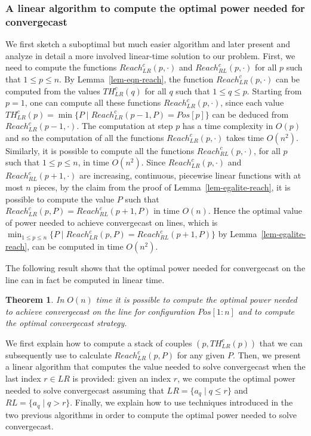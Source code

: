 \documentclass{article}
\newtheorem{theorem}{Theorem}
\newcommand\rclr{Reach_{LR}^c\xspace}
\newcommand\rcrl{Reach_{RL}^c\xspace}
\newcommand\tclr{TH_{LR}^c\xspace}
\newcommand\convergecast{convergecast\xspace}
\begin{document}
\subsubsection{A linear algorithm to compute the optimal power needed for
  {\convergecast}}  

We first sketch a suboptimal but much easier algorithm and later present and analyze in detail
a more involved linear-time solution to our problem.
First, we need to compute the functions $\rclr(p,\cdot)$ and $\rcrl(p,\cdot)$ for all $p$ such that $1\leq p\leq n$. By Lemma~\ref{lem-eqn-reach}, the function $\rclr(p,\cdot)$ can be computed from the values $\tclr(q)$ for all $q$ such that $1 \leq q\leq p$. Starting from $p=1$, one can compute all these functions $\rclr(p,\cdot)$, since each value $\tclr(p)=\min\{P\mid \rclr(p-1,P)=Pos[p]\}$ can be deduced from 
$\rclr(p-1,\cdot)$. The computation at step $p$ has a time complexity in $O(p)$ and so the computation of all the functions $\rclr(p,\cdot)$ takes time $O(n^2)$. Similarly, it is possible to compute all the functions $\rcrl(p,\cdot)$, for all $p$ such that $1 \leq p\leq n$, in time $O(n^2)$.  Since $\rclr(p,\cdot)$ and $\rcrl(p+1,\cdot)$ are increasing, continuous, piecewise linear functions with at most $n$ pieces, by the claim from the proof of Lemma~\ref{lem-egalite-reach}, it is possible to compute the value $P$ such that $\rclr(p,P) = \rcrl(p+1,P)$ in time $O(n)$. Hence the optimal value of power needed to achieve {\convergecast} on lines, which is $\min_{1\leq p\leq n}\{P\mid \rclr(p,P) = \rcrl(p+1,P)\}$ by Lemma~\ref{lem-egalite-reach}, can be computed in time $O(n^2)$. 

\medskip

The following result shows that the optimal power needed for convergecast on the line can in fact be computed in linear time.

\begin{theorem}\label{thm:OptPower}
In $O(n)$ time it is possible to compute  the optimal power needed to achieve
{\convergecast} on the line for configuration $Pos[1:n]$  and to compute the optimal convergecast strategy.
\end{theorem}

We first explain how to compute a stack of couples $(p,\tclr(p))$
that we can subsequently use to calculate $\rclr(p,P)$ for any
given $P$.
Then, we present a linear algorithm that computes the value needed to
solve {\convergecast} when the last index $r \in LR$ is provided:
given an index $r$, we compute the optimal power needed to solve
{\convergecast} assuming that $LR = \{a_q\mid q \leq r\}$ and $RL
=\{a_q\mid q > r\}$.
Finally, we explain how to use techniques introduced in the two
previous algorithms in order to compute the optimal power needed to
solve {\convergecast}. 
\end{document}

